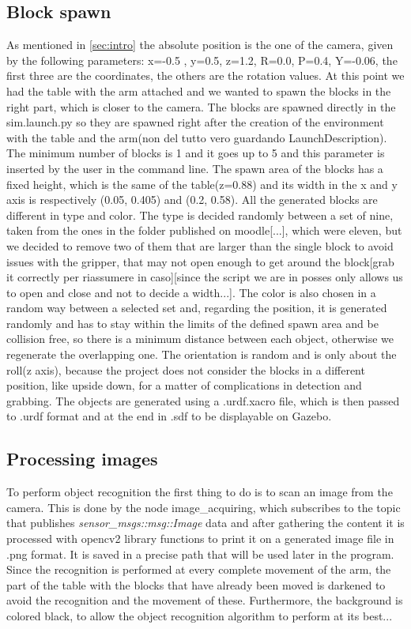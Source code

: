 \documentclass[12pt,a4paper]{article}
\begin{document}
\subsection{Block spawn}\label{subsec:blockspawn}
As mentioned in \ref{sec:intro} the absolute position is the one of the camera, given by the following parameters: x=-0.5 , y=0.5, z=1.2, R=0.0, P=0.4, Y=-0.06, the first three are the coordinates, the others are the rotation values. At this point we had the table with the arm attached and we wanted to spawn the blocks in the right part, which is closer to the camera. The blocks are spawned directly in the sim.launch.py so they are spawned right after the creation of the environment with the table and the arm(non del tutto vero guardando LaunchDescription). The minimum number of blocks is 1 and it goes up to 5 and this parameter is inserted by the user in the command line. The spawn area of the blocks has a fixed height, which is the same of the table(z=0.88) and its width in the x and y axis is respectively (0.05, 0.405) and (0.2, 0.58). All the generated blocks are different in type and color. The type is decided randomly between a set of nine, taken from the ones in the folder published on moodle[...], which were eleven, but we decided to remove two of them that are larger than the single block to avoid issues with the gripper, that may not open enough to get around the block[grab it correctly per riassumere in caso][since the script we are in posses only allows us to open and close and not to decide a width...]. The color is also chosen in a random way between a selected set and, regarding the position, it is generated randomly and has to stay within the limits of the defined spawn area and be collision free, so there is a minimum distance between each object, otherwise we regenerate the overlapping one. The orientation is random and is only about the roll(z axis), because the project does not consider the blocks in a different position, like upside down, for a matter of complications in detection and grabbing.
The objects are generated using a .urdf.xacro file, which is then passed to .urdf format and at the end in .sdf to be displayable on Gazebo. 


\subsection{Processing images}\label{subsec:imageproc}
To perform object recognition the first thing to do is to scan an image from the camera. This is done by the node image\_acquiring, which subscribes to the topic that publishes \textit{sensor\_msgs::msg::Image} data and after gathering the content it is processed with opencv2 library functions to print it on a generated image file in .png format. It is saved in a precise path that will be used later in the program.\\Since the recognition is performed at every complete movement of the arm, the part of the table with the blocks that have already been moved is darkened to avoid the recognition and the movement of these. Furthermore, the background is colored black, to allow the object recognition algorithm to perform at its best...
\end{document}
